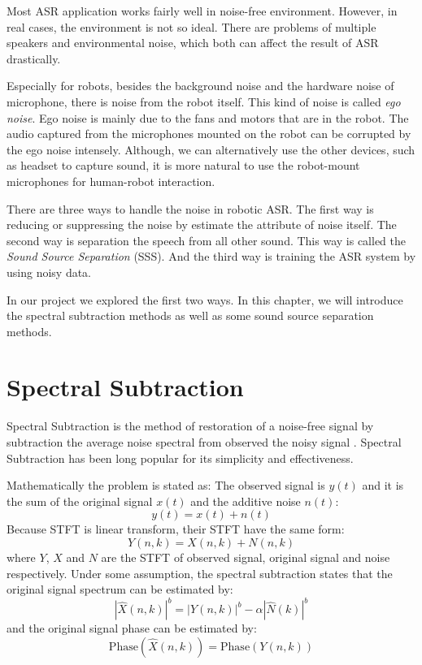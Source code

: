 \documentclass[11pt,a4paper]{report}
\begin{document}
Most ASR application works fairly well in noise-free environment. However, in real cases, the environment is not so ideal. There are problems of multiple speakers and environmental noise, which both can affect the result of ASR drastically.

Especially for robots, besides the background noise and the hardware noise of microphone, there is noise from the robot itself. This kind of noise is called \textit{ego noise}\cite{ince_ego_2011}. Ego noise is mainly due to the fans and motors that are in the robot. The audio captured from the microphones mounted on the robot can be corrupted by the ego noise intensely. Although, we can alternatively use the other devices, such as headset to capture sound, it is more natural to use the robot-mount microphones for human-robot interaction.

There are three ways to handle the noise in robotic ASR. The first way is reducing or suppressing the noise by estimate the attribute of noise itself. The second way is separation the speech from all other sound. This way is called the \textit{Sound Source Separation} (SSS). And the third way is training the ASR system by using noisy data.

In our project we explored the first two ways. In this chapter, we will introduce the spectral subtraction methods as well as some sound source separation methods.

\section{Spectral Subtraction}
Spectral Subtraction is the method of restoration of a noise-free signal by subtraction the average noise spectral from observed the noisy signal \cite{boll_suppression_1979, vaseghi_spectral_2001}. Spectral Subtraction has been long popular for its simplicity and effectiveness.

Mathematically the problem is stated as: The observed signal is $y(t)$ and it is the sum of the original signal $x(t)$ and the additive noise $n(t)$:
\[ y(t) = x(t) + n(t) \]
Because STFT is linear transform, their STFT have the same form:
\[ Y(n,k) = X(n,k) + N(n,k) \]
where $Y$, $X$ and $N$ are the STFT of observed signal, original signal and noise respectively. Under some assumption, the spectral subtraction states that the original signal spectrum can be estimated by:
\begin{equation}
  |\hat{X}(n,k)|^b = |Y(n,k)|^b - \alpha|\hat{N}(k)|^b 
  \label{eq:specsub}
\end{equation}
and the original signal phase can be estimated by:
\begin{equation}
  \text{Phase}(\hat{X}(n,k)) = \text{Phase}(Y(n,k))
  \label{eq:phasees}
\end{equation}
\end{document}
